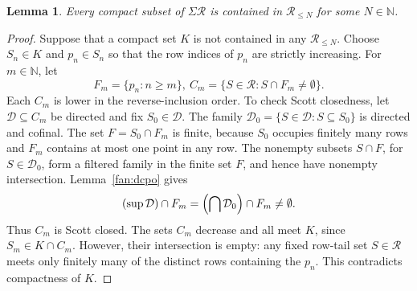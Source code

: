 \documentclass[10pt,a4paper]{article}
\newtheorem{lemma}[theorem]{Lemma}
\theoremstyle{definition}
\newcommand{\N}{\mathbb N}
\newcommand{\RR}{\mathcal R}
\begin{document}
\begin{lemma}\label{fan:compact-rows}
Every compact subset of $\Sigma\RR$ is contained in $\RR_{\leq N}$ for some $N\in\N$.
\end{lemma}
\begin{proof}
Suppose that a compact set $K$ is not contained in any $\RR_{\leq N}$. Choose $S_n\in K$ and $p_n\in S_n$ so that the row indices of $p_n$ are strictly increasing. For $m\in\N$, let
\[
 F_m=\{p_n:n\geq m\},
 ~
 C_m=\{S\in\RR:S\cap F_m\ne\emptyset\}.
\]
Each $C_m$ is lower in the reverse-inclusion order. To check Scott closedness, let $\mathcal D\subseteq C_m$ be directed and fix $S_0\in\mathcal D$. The family $\mathcal D_0=\{S\in\mathcal D:S\subseteq S_0\}$ is directed and cofinal. The set $F=S_0\cap F_m$ is finite, because $S_0$ occupies finitely many rows and $F_m$ contains at most one point in any row. The nonempty subsets $S\cap F$, for $S\in\mathcal D_0$, form a filtered family in the finite set $F$, and hence have nonempty intersection. Lemma~\ref{fan:dcpo} gives
\[
 (\sup\mathcal D)\cap F_m
 =\Bigl(\bigcap\mathcal D_0\Bigr)\cap F_m\ne\emptyset.
\]
Thus $C_m$ is Scott closed. The sets $C_m$ decrease and all meet $K$, since $S_m\in K\cap C_m$. However, their intersection is empty: any fixed row-tail set $S\in\RR$ meets only finitely many of the distinct rows containing the $p_n$. This contradicts compactness of $K$.
\end{proof}
\end{document}
